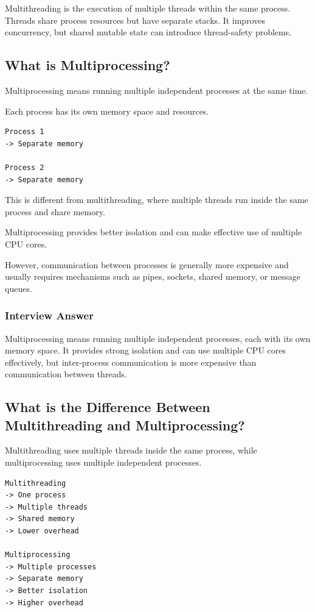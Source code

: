 \documentclass[12pt,a4paper]{article}
\begin{document}
Multithreading is the execution of multiple threads within the same process.
Threads share process resources but have separate stacks. It improves
concurrency, but shared mutable state can introduce thread-safety problems.

\subsection{What is Multiprocessing?}

Multiprocessing means running multiple independent processes at the same
time.

Each process has its own memory space and resources.

\begin{verbatim}
Process 1
-> Separate memory

Process 2
-> Separate memory
\end{verbatim}

This is different from multithreading, where multiple threads run inside
the same process and share memory.

Multiprocessing provides better isolation and can make effective use of
multiple CPU cores.

However, communication between processes is generally more expensive and
usually requires mechanisms such as pipes, sockets, shared memory, or
message queues.

\subsubsection*{Interview Answer}

Multiprocessing means running multiple independent processes, each with its
own memory space. It provides strong isolation and can use multiple CPU
cores effectively, but inter-process communication is more expensive than
communication between threads.

\subsection{What is the Difference Between Multithreading and Multiprocessing?}

Multithreading uses multiple threads inside the same process, while
multiprocessing uses multiple independent processes.

\begin{verbatim}
Multithreading
-> One process
-> Multiple threads
-> Shared memory
-> Lower overhead

Multiprocessing
-> Multiple processes
-> Separate memory
-> Better isolation
-> Higher overhead
\end{verbatim}
\end{document}
